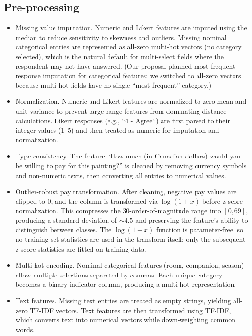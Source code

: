 \documentclass[12pt]{article}
\begin{document}
\subsection{Pre-processing}
\begin{itemize}
\item Missing value imputation. Numeric and Likert features are imputed using the median to reduce sensitivity to skewness and outliers. Missing nominal categorical entries are represented as all-zero multi-hot vectors (no category selected), which is the natural default for multi-select fields where the respondent may not have answered. (Our proposal planned most-frequent-response imputation for categorical features; we switched to all-zero vectors because multi-hot fields have no single ``most frequent'' category.)
\item Normalization. Numeric and Likert features are normalized to zero mean and unit variance to prevent large-range features from dominating distance calculations. Likert responses (e.g., ``4 - Agree'') are first parsed to their integer values (1--5) and then treated as numeric for imputation and normalization. 
\item Type consistency. The feature ``How much (in Canadian dollars) would you be willing to pay for this painting?'' is cleaned by removing currency symbols and non-numeric texts, then converting all entries to numerical values.
\item Outlier-robust pay transformation. After cleaning, negative pay values are clipped to 0, and the column is transformed via $\log(1+x)$ before z-score normalization. This compresses the 30-order-of-magnitude range into $[0, 69]$, producing a standard deviation of ${\sim}4.5$ and preserving the feature's ability to distinguish between classes. The $\log(1+x)$ function is parameter-free, so no training-set statistics are used in the transform itself; only the subsequent z-score statistics are fitted on training data.
\item Multi-hot encoding. Nominal categorical features (room, companion, season) allow multiple selections separated by commas. Each unique category becomes a binary indicator column, producing a multi-hot representation.
\item Text features. Missing text entries are treated as empty strings, yielding all-zero TF-IDF vectors. Text features are then transformed using TF-IDF, which converts text into numerical vectors while down-weighting common words.
\end{itemize}
\end{document}
